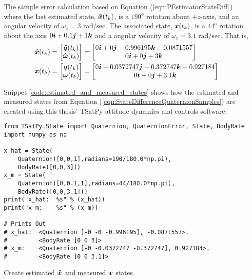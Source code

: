 The sample error calculation based on Equation (\ref{eqn:PEstimatorStateDiff}) where the last estimated state, $\boldsymbol{\hat{x}}(t_{k})$, is a $190^o$ rotation about $+z$-axis, and an angular velocity of $\omega_z = 3$ rad/sec.  The associated state, $\boldsymbol{x}(t_{k})$, is a $44^o$ rotation about the axis $0 \boldsymbol{i} + 0.1 \boldsymbol{j} + 1\boldsymbol{k}$ and a angular velocity of $\omega_z = 3.1$ rad/sec.  That is,
\begin{subequations}
  \begin{align}
    \boldsymbol{\hat{x}}(t_{k})
    = \begin{bmatrix}  \boldsymbol{\hat{q}}(t_{k}) \\ \boldsymbol{\hat{\omega}}(t_{k}) \end{bmatrix}
    &= \begin{bmatrix} 0 \boldsymbol{i} +0 \boldsymbol{j} -0.996195 \boldsymbol{k} -0.0871557 \\ 0 \boldsymbol{i} +0 \boldsymbol{j} +3 \boldsymbol{k} \end{bmatrix}\\
    \boldsymbol{x}(t_{k})
    = \begin{bmatrix}  \boldsymbol{q}(t_{k}) \\ \boldsymbol{\omega}(t_{k}) \end{bmatrix}
    &= \begin{bmatrix} 0 \boldsymbol{i} -0.0372747 \boldsymbol{j} -0.372747 \boldsymbol{k} +0.927184 \\ 0 \boldsymbol{i} +0 \boldsymbol{j} +3.1 \boldsymbol{k} \end{bmatrix}
  \end{align}
  \label{eqn:StateDifferenceQuaternionSamples}
\end{subequations}

Snippet \ref{code:estimated_and_measured_states} shows how the estimated and measured states from Equation (\ref{eqn:StateDifferenceQuaternionSamples}) are created using this thesis' TSatPy attitude dynamics and controls software.
\begin{listing}[H]
\begin{singlespace}
  \begin{verbatim}
from TSatPy.State import Quaternion, QuaternionError, State, BodyRate
import numpy as np

x_hat = State(
    Quaternion([0,0,1],radians=190/180.0*np.pi),
    BodyRate([0,0,3]))
x_m = State(
    Quaternion([0,0.1,1],radians=44/180.0*np.pi),
    BodyRate([0,0,3.1]))
print("x_hat:  %s" % (x_hat))
print("x_m:    %s" % (x_m))

# Prints Out
# x_hat:  <Quaternion [-0 -0 -0.996195], -0.0871557>,
#         <BodyRate [0 0 3]>
# x_m:    <Quaternion [-0 -0.0372747 -0.372747], 0.927184>,
#         <BodyRate [0 0 3.1]>
  \end{verbatim}
\caption{Create estimated $\bs{\hat{x}}$ and measured $\bs{x}$ states}
\label{code:estimated_and_measured_states}
\nocite{minted}
\end{singlespace}
\end{listing}

